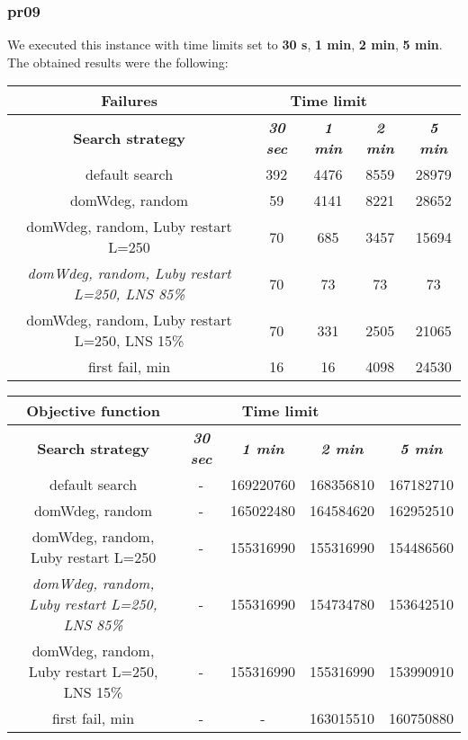 \subsubsection{pr09}
We executed this instance with time limits set to \textbf{30 s}, \textbf{1 min}, \textbf{2 min}, \textbf{5 min}.\\
The obtained results were the following:
{
\renewcommand{\arraystretch}{2}
\begin{longtable}[h]{| c | c | c | c | c |}
    \hline
    \textbf{Failures} & \multicolumn{3}{c}{Time limit} & \\
    \hline
    \textbf{Search strategy} & \textbf{\textit{30 sec}} & \textbf{\textit{1 min}} & \textbf{\textit{2 min}} & \textbf{\textit{5 min}} \\
    \hline
    \endhead
    default search                                         & 392 & 4476 & 8559 & 28979 \\
    \hline
    domWdeg, random                                        &  59 & 4141 & 8221 & 28652 \\
    \hline
    domWdeg, random, Luby restart L=250                    &  70 &  685 & 3457 & 15694 \\
    \hline
    \textit{domWdeg, random, Luby restart L=250, LNS 85\%} &  70 &   73 &   73 &    73 \\
    \hline
    domWdeg, random, Luby restart L=250, LNS 15\%          &  70 &  331 & 2505 &  21065 \\
    \hline
    first fail, min                                        &  16 &   16 & 4098 &  24530 \\
    \hline
\end{longtable}
}

{
\renewcommand{\arraystretch}{2}
\begin{longtable}[h]{| c | c | c | c | c |}
    \hline
    \textbf{Objective function} & \multicolumn{3}{c}{Time limit} & \\
    \hline
    \textbf{Search strategy} & \textbf{\textit{30 sec}} & \textbf{\textit{1 min}} & \textbf{\textit{2 min}} & \textbf{\textit{5 min}} \\
    \hline
    \endhead
    default search                                         & - & 169220760 & 168356810 & 167182710 \\
    \hline
    domWdeg, random                                        & - & 165022480 & 164584620 & 162952510 \\
    \hline
    domWdeg, random, Luby restart L=250                    & - & 155316990 & 155316990 & 154486560 \\
    \hline
    \textit{domWdeg, random, Luby restart L=250, LNS 85\%} & - & 155316990 & 154734780 & 153642510 \\
    \hline
    domWdeg, random, Luby restart L=250, LNS 15\%          & - & 155316990 & 155316990 & 153990910 \\
    \hline
    first fail, min                                        & - &         - & 163015510 & 160750880 \\
    \hline
\end{longtable}
}